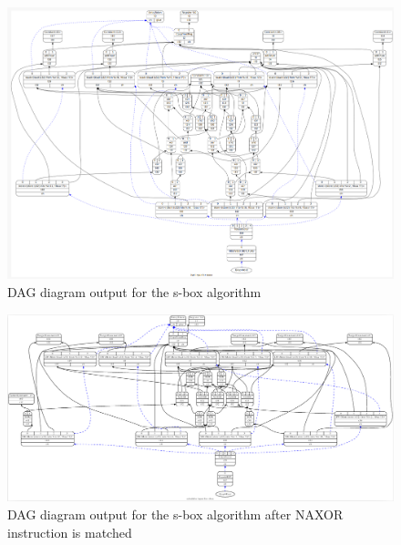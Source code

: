 \begin{figure}
    \centering
    \includegraphics[scale=0.35]{adding_new_instr/naxor_dag_diagram.png}
    \caption{DAG diagram output for the s-box algorithm}
    \label{fig:naxor_dag_diagram}
\end{figure}

\begin{minipage}{\linewidth}

\end{minipage}

\begin{minipage}{\linewidth}

\end{minipage}

\begin{figure}
    \centering
    \includegraphics[scale=0.19]{adding_new_instr/naxor_match.png}
    \caption{DAG diagram output for the s-box algorithm after NAXOR instruction is matched}
    \label{fig:naxor_match_diagram}
\end{figure}

